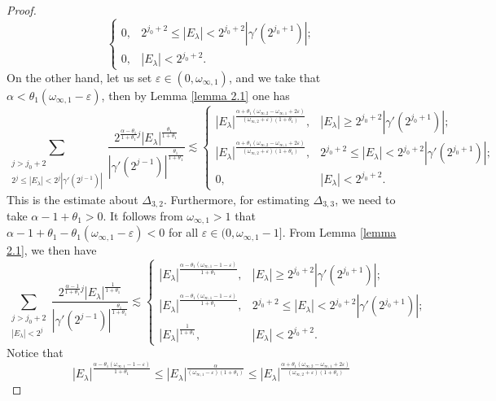 \documentclass[10pt,a4paper]{amsart}
\begin{document}
\begin{proof}
$$\begin{cases}
  0, & 2^{j_0+2}\leq|E_{\lambda}|<2^{j_0+2}|\gamma'(2^{j_{0}+1})|;\\
  0, &|E_{\lambda}|<2^{j_0+2}.
\end{cases}$$
On the other hand, let us set $\varepsilon\in(0,\omega_{\infty,1})$, and we take that $\alpha<\theta_{1}(\omega_{\infty,1}-\varepsilon)$, then by Lemma \ref{lemma 2.1} one has
$$\sum\limits_{  \substack{j>j_{0}+2   \\2^j\leq|E_\lambda|<2^j|\gamma'(2^{j-1})|  }}   {\frac{2^{{\frac{\alpha-\theta_{1}}{1+\theta_{1}}}j}|E_\lambda|^{\frac{\theta_{1}}{1+\theta_{1}}}}{|\gamma'(2^{j-1})|^{\frac{\theta_{1}}{1+\theta_{1}}}}} \lesssim
\begin{cases}
  |E_\lambda|^{{\frac{\alpha+\theta_1(\omega_{\infty,2}-\omega_{\infty,1}+2\varepsilon)}{(\omega_{\infty,2}+\varepsilon)(1+\theta_{1})}}}, & |E_\lambda|\geq2^{j_0+2}|\gamma'(2^{j_{0}+1})|;\\
  |E_\lambda|^{{\frac{\alpha+\theta_1(\omega_{\infty,2}-\omega_{\infty,1}+2\varepsilon)}{(\omega_{\infty,2}+\varepsilon)(1+\theta_{1})}}}, & 2^{j_0+2}\leq|E_{\lambda}|<2^{j_0+2}|\gamma'(2^{j_{0}+1})|;\\
 0, &|E_{\lambda}|<2^{j_0+2}.
\end{cases}$$
This is the estimate about $\Delta_{3,2}$. Furthermore, for estimating $\Delta_{3,3}$, we need to take $\alpha-1+\theta_{1}>0$. It follows from $\omega_{\infty,1}>1$ that $\alpha-1+\theta_{1}-\theta_{1}(\omega_{\infty,1}-\varepsilon)<0$ for all $\varepsilon\in(0,\omega_{\infty,1}-1]$. From Lemma \ref{lemma 2.1}, we then have
$$\sum\limits_{  \substack{j>j_{0}+2   \\|E_\lambda|<2^j}}  {\frac{2^{{\frac{\alpha-1}{1+\theta_{1}}}j}|E_\lambda|^{\frac{1}{1+\theta_{1}}}}{|\gamma'(2^{j-1})|^{\frac{\theta_{1}}{1+\theta_{1}}}}}\lesssim
\begin{cases}
  |E_\lambda|^{{\frac{\alpha-\theta_1(\omega_{\infty,1}-1-\varepsilon)}{1+\theta_{1}}}},
  & |E_\lambda|\geq2^{j_0+2}|\gamma'(2^{j_{0}+1})|; \\
  |E_\lambda|^{{\frac{\alpha-\theta_1(\omega_{\infty,1}-1-\varepsilon)}{1+\theta_{1}}}},  & 2^{j_0+2}\leq|E_{\lambda}|<2^{j_0+2}|\gamma'(2^{j_{0}+1})|;\\
  |E_\lambda|^{{\frac{1}{1+\theta_1}}}, &|E_{\lambda}|<2^{j_0+2}.
\end{cases}$$
Notice that  $$ |E_\lambda|^{{\frac{\alpha-\theta_1(\omega_{\infty,1}-1-\varepsilon)}{1+\theta_{1}}}}\leq|E_\lambda|^{\frac{\alpha}{(\omega_{\infty,1}-\varepsilon)(1+\theta_{1})}} \leq  |E_\lambda|^{{\frac{\alpha+\theta_1(\omega_{\infty,2}-\omega_{\infty,1}+2\varepsilon)}{(\omega_{\infty,2}+\varepsilon)(1+\theta_{1})}}}$$

\end{proof}
\end{document}

